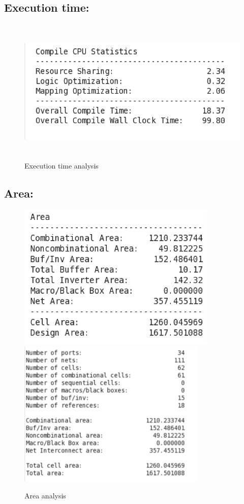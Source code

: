\documentclass[20pt]{article}
\begin{document}
\subsection{Execution time:}

\begin{figure}[H]
	\includegraphics[width=0.9\linewidth,height=7cm]{Compiletime}
	\caption{Execution time analysis }
\end{figure}

\subsection{Area:}

\begin{figure}[H]
	\includegraphics[width=0.9\linewidth,height=7cm]{Area}
	\includegraphics[width=0.9\linewidth,height=7cm]{Area2}
	\caption{Area analysis }
\end{figure}
\newpage
\end{document}
